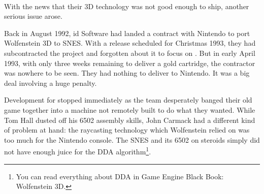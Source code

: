 \\
\par
{}%
\label{HUD_screenshot}
\par
With the news that their 3D technology was not good enough to ship, another serious issue arose.\\
\par
Back in August 1992, id Software had landed a contract with Nintendo to port Wolfenstein 3D to SNES. With a release scheduled for Christmas 1993, they had subcontracted the project and forgotten about it to focus on \doom. But in early April 1993, with only three weeks remaining to deliver a gold cartridge, the contractor was nowhere to be seen. They had nothing to deliver to Nintendo. It was a big deal involving a huge penalty.\\
\par
 Development for \doom{} stopped immediately as the team desperately banged their old game together into a machine not remotely built to do what they wanted. While Tom Hall dusted off his 6502 assembly skills, John Carmack had a different kind of problem at hand: the raycasting technology which Wolfenstein relied on was too much for the Nintendo console. The SNES and its 6502 on steroids simply did not have enough juice for the DDA algorithm\footnote{You can read everything about DDA in Game Engine Black Book: Wolfenstein 3D.}.\\%
\par



